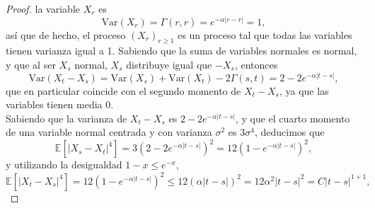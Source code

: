 \documentclass[letterpaper]{article}
\newcommand{\E}{\mathbb{E}}
\newcommand{\1}{\mathds{1}}
\theoremstyle{definition}
\theoremstyle{definition}
\theoremstyle{definition}
\theoremstyle{definition}
\theoremstyle{definition}
\begin{document}
\begin{enumerate}
\begin{proof}
     la variable $X_r$ es
     \[
     \text{Var}\left(X_r\right)=\Gamma(r,r)= e^{-\alpha|r-r|}=1,   
     \]
     así que de hecho, el proceso $(X_r)_{r\geq 1}$ es un proceso tal que todas las variables tienen varianza igual a 1. Sabiendo que
     la suma de variables normales es normal, y que al ser $X_s$ normal, $X_s$ distribuye igual que $-X_s$, entonces
     \[
     \text{Var}\left(X_t-X_s\right)=\text{Var}\left(X_s\right)+\text{Var}\left(X_t\right)-2\Gamma(s,t)=2-2e^{-\alpha|t-s|},   
     \] 
    que en particular coincide con el segundo momento de $X_t-X_s$, ya que las variables tienen media 0.\\

    Sabiendo que la varianza de $X_t-X_s$ es $2-2e^{-\alpha|t-s|}$, y que el cuarto momento de una variable normal centrada
    y con varianza $\sigma^2$ es $3\sigma^4$, deducimos que
    \[
    \E\left[|X_s-X_t|^4\right]=3(2-2e^{-\alpha|t-s|})^2=12(1-e^{-\alpha|t-s|})^2,    
    \]
    y utilizando la desigualdad $1-x\leq e^{-x}$, 
    \[
      \E\left[|X_t-X_s|^4\right]=12(1-e^{-\alpha|t-s|})^2\leq 12(\alpha|t-s|)^2=12\alpha^2|t-s|^{2}=C|t-s|^{1+1},  
    \]
\end{proof}
\end{enumerate}
\end{document}
